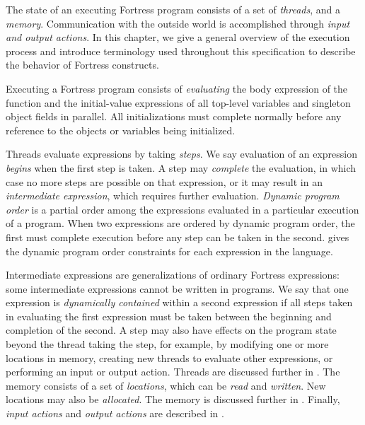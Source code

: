 %
%
%
%

The state of an executing Fortress program consists of a set of
\emph{threads}, and a \emph{memory}.  Communication with the outside
world is accomplished through \emph{input and output actions}.  In
this chapter, we give a general overview of the execution process and
introduce terminology used throughout this specification
to describe the behavior of Fortress constructs.

Executing a Fortress program consists of \emph{evaluating}
the body expression of the  function and
the initial-value expressions of all top-level variables and singleton
object fields in parallel.
All initializations must complete normally before any reference to the
objects or variables being initialized.

Threads evaluate expressions by taking \emph{steps}.
We say evaluation of an expression \emph{begins} when the first step is
taken.
A step may \emph{complete} the evaluation, in which case no more steps
are possible on that expression, or it may result in an
\emph{intermediate expression}, which requires further evaluation.
\emph{Dynamic program order} is a partial order among the expressions
evaluated in a particular execution of a program.  When two
expressions are ordered by dynamic program order, the first must
complete execution before any step can be taken in the second.
 gives the dynamic program order constraints for
each expression in the language.

Intermediate expressions
are generalizations of ordinary Fortress expressions:
some intermediate expressions cannot be written in programs.
We say that one expression
is \emph{dynamically contained} within a second expression
if all steps taken in evaluating the first expression
must be taken between the beginning and completion of the second.
A step may also have effects on the program state
beyond the thread taking the step,
for example, by modifying one or more locations in memory,
creating new threads to evaluate other expressions,
or performing an input or output action.
Threads are discussed further in .
The memory consists of a set of \emph{locations},
which can be \emph{read} and \emph{written}.
New locations may also be \emph{allocated}.
The memory is discussed further in .
Finally, \emph{input actions} and \emph{output actions} are described in .
